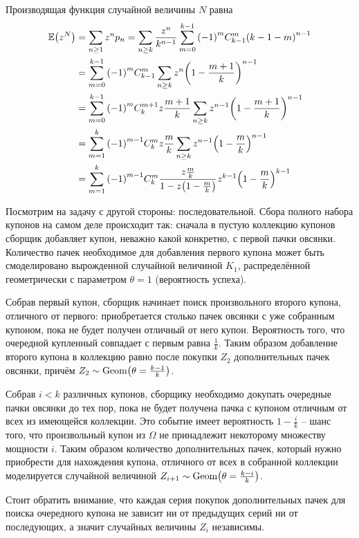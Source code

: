 \documentclass[a4paper]{article}
\let\originalleft\left
\let\originalright\right
\renewcommand{\left}{\mathopen{}\mathclose\bgroup\originalleft}
\renewcommand{\right}{\aftergroup\egroup\originalright}
\newcommand{\brac}[1]{{\left ( #1 \right )}}
\newcommand{\Ex}[0]{{\mathbb{E}}}
\begin{document}
Производящая функция случайной величины $N$ равна
\begin{align*}
	\Ex\brac{z^N} &= \sum_{n\geq 1} z^n p_n
		= \sum_{n\geq k} \frac{z^n}{k^{n-1}} \sum_{m=0}^{k-1} \brac{-1}^m C^m_{k-1} \brac{k-1 - m}^{n-1} \\
		& = \sum_{m=0}^{k-1} \brac{-1}^m C^m_{k-1} \sum_{n\geq k} z^n \brac{1 - \frac{m+1}{k}}^{n-1} \\
		& = \sum_{m=0}^{k-1} \brac{-1}^m C^{m+1}_k z \frac{m+1}{k} \sum_{n\geq k} z^{n-1} \brac{1 - \frac{m+1}{k}}^{n-1}\\
		& = \sum_{m=1}^k \brac{-1}^{m-1} C^m_k z \frac{m}{k} \sum_{n\geq k} z^{n-1} \brac{1 - \frac{m}{k}}^{n-1} \\
		& = \sum_{m=1}^k \brac{-1}^{m-1} C^m_k \frac{z \frac{m}{k}}{1-z\brac{1 - \frac{m}{k}}} z^{k-1} \brac{1 - \frac{m}{k}}^{k-1}
\end{align*}

Посмотрим на задачу с другой стороны: последовательной.
Сбора полного набора купонов на самом деле происходит так: сначала в пустую
коллекцию купонов сборщик добавляет купон, неважно какой конкретно, с первой
пачки овсянки.
Количество пачек необходимое для добавления первого купона может быть
смоделировано вырожденной случайной величиной $K_1$, распределённой
геометрически с параметром $\theta = 1$ (вероятность успеха).

Собрав первый купон, сборщик начинает поиск произвольного второго купона,
отличного от первого: приобретается столько пачек овсянки с уже собранным
купоном, пока не будет получен отличный от него купон.
Вероятность того, что очередной купленный совпадает с первым равна
$\frac{1}{k}$.
Таким образом добавление второго купона в коллекцию равно после покупки $Z_2$
дополнительных пачек овсянки, причём
$Z_2\sim \text{Geom}\brac{\theta=\frac{k-1}{k}}$.

Собрав $i<k$ различных купонов, сборщику необходимо докупать очередные пачки
овсянки до тех пор, пока не будет получена пачка с купоном отличным от всех из
имеющейся коллекции.
Это событие имеет вероятность $1-\frac{i}{k}$ -- шанс того, что произвольный
купон из $\Omega$ не принадлежит некоторому множеству мощности $i$.
Таким образом количество дополнительных пачек, который нужно приобрести для
нахождения купона, отличного от всех в собранной коллекции моделируется
случайной величиной $Z_{i+1}\sim \text{Geom}\brac{\theta=\frac{k-i}{k}}$.

Стоит обратить внимание, что каждая серия покупок дополнительных пачек для
поиска очередного купона не зависит ни от предыдущих серий ни от последующих,
а значит случайных величины $Z_i$ независимы.
\end{document}
